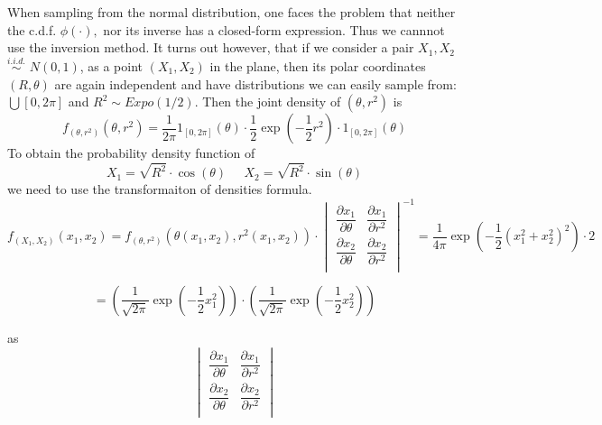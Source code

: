 \documentclass[a4paper,10pt]{article}
\newenvironment{example}[1][Example]{\begin{trivlist}
\item[\hskip \labelsep {\bfseries #1}]}{\end{trivlist}}
\begin{document}
  \begin{example}[Box-Muller Method for Sampling from Gaussians]
   When sampling from the normal distribution, one faces the problem that neither the c.d.f. $\phi(\cdot),$ nor
   its inverse has a closed-form expression. Thus we cannnot use the inversion method. 
 It turns out however, that if we consider a pair $X_1,X_2$ $\stackrel{i.i.d.}\sim$ $N(0,1)$, as a point $(X_1,X_2)$
  in the plane, then its polar coordinates $(R,\theta)$ are again independent and have distributions we can easily
  sample from: $\bigcup[0,2\pi]$ and $R^{2} \sim Expo(1/2)$. Then the joint density of $(\theta, r^{2})$
  is 
 \begin{equation*}
  f_{(\theta,r^{2})}(\theta, r^{2}) = \frac{1}{2 \pi} 1_{[0,2\pi]}(\theta) \cdot 
  \frac{1}{2} \exp \left(- \frac{1}{2}r^2\right) \cdot 1_{[0,2\pi]}(\theta)
 \end{equation*}
To obtain the probability density function of 
\begin{equation*}
 X_1 = \sqrt{R^{2}}\cdot \cos(\theta) \;\;\;\;\; X_2 = \sqrt{R^{2}}\cdot \sin(\theta)
\end{equation*}
we need to use the transformaiton of densities formula.
\begin{equation*}
 f_{(X_1,X_2)}(x_1,x_2)=f_{(\theta,r^{2})}(\theta(x_1,x_2),r^{2}(x_1,x_2))\cdot \begin{vmatrix}
\dfrac{\partial x_1}{\partial \theta} & \dfrac{\partial x_1}{\partial r^{2}} \\[3pt]
\dfrac{\partial x_2}{\partial \theta} & \dfrac{\partial x_2}{\partial r^{2}} \\[3pt]

\end{vmatrix}^{-1} = \frac{1}{4\pi}\exp\left(-\frac{1}{2}(x_1^{2} + x_2^{2})^{2}\right)\cdot 2
\end{equation*}
\begin{flushright}
\begin{displaymath}
 = \left(\frac{1}{\sqrt{2\pi}}\exp \left(-\frac{1}{2}x^{2}_{1}\right)\right)\cdot \left(\frac{1}{\sqrt{2\pi}}\exp \left(-\frac{1}{2}x^{2}_{2}\right)\right)
\end{displaymath}\end{flushright}
as 
\begin{displaymath}
 \begin{vmatrix}
\dfrac{\partial x_1}{\partial \theta} & \dfrac{\partial x_1}{\partial r^{2}} \\[3pt]
\dfrac{\partial x_2}{\partial \theta} & \dfrac{\partial x_2}{\partial r^{2}} \\[3pt]


\end{vmatrix}
\end{displaymath}
\end{example}
\end{document}
